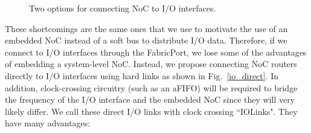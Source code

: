 %
\begin{figure}[t]
\centering
{}
\caption{Two options for connecting NoC to I/O interfaces.}
\label{two_options_io}
\end{figure}
%

These shortcomings are the same ones that we use to motivate the use of an embedded NoC instead of a soft bus to distribute I/O data.
Therefore, if we connect to I/O interfaces through the FabricPort, we lose some of the advantages of embedding a system-level NoC.
Instead, we propose connecting NoC routers directly to I/O interfaces using hard links as shown in Fig.~\ref{io_direct}.
In addition, clock-crossing circuitry (such as an aFIFO) will be required to bridge the frequency of the I/O interface and the embedded NoC since they will very likely differ.
We call these direct I/O links with clock crossing ``IOLinks".
They have many advantages:

